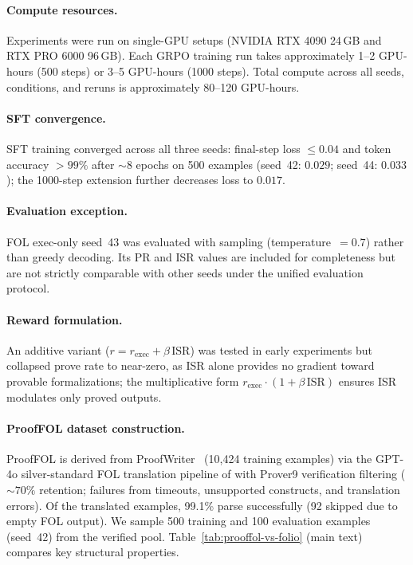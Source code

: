 \paragraph{Compute resources.}
Experiments were run on single-GPU setups (NVIDIA RTX 4090 24\,GB and RTX PRO 6000 96\,GB).
Each GRPO training run takes approximately 1--2 GPU-hours (500 steps) or 3--5 GPU-hours (1000 steps).
Total compute across all seeds, conditions, and reruns is approximately 80--120 GPU-hours.

\paragraph{SFT convergence.}
SFT training converged across all three seeds: final-step loss ${\leq}0.04$ and token accuracy ${>}99\%$ after ${\sim}8$ epochs on 500 examples (seed~42: $0.029$; seed~44: $0.033$); the 1000-step extension further decreases loss to $0.017$.

\paragraph{Evaluation exception.}
FOL exec-only seed~43 was evaluated with sampling (temperature~$=0.7$) rather than greedy decoding.
Its PR and ISR values are included for completeness but are not strictly comparable with other seeds under the unified evaluation protocol.

\paragraph{Reward formulation.}
An additive variant ($r = r_{\text{exec}} + \beta\,\text{ISR}$) was tested in early experiments but collapsed prove rate to near-zero, as ISR alone provides no gradient toward provable formalizations; the multiplicative form $r_{\text{exec}}\cdot(1+\beta\,\text{ISR})$ ensures ISR modulates only proved outputs.

\paragraph{ProofFOL dataset construction.}
\label{app:prooffol-construction}
ProofFOL is derived from ProofWriter~\citep{proofwriter} (10{,}424 training examples) via the GPT-4o silver-standard FOL translation pipeline of \citet{prooffol-thatikonda2024} with Prover9 verification filtering (${\sim}70\%$ retention; failures from timeouts, unsupported constructs, and translation errors).
Of the translated examples, 99.1\% parse successfully (92 skipped due to empty FOL output).
We sample 500 training and 100 evaluation examples (seed~42) from the verified pool.
Table~\ref{tab:prooffol-vs-folio} (main text) compares key structural properties.

